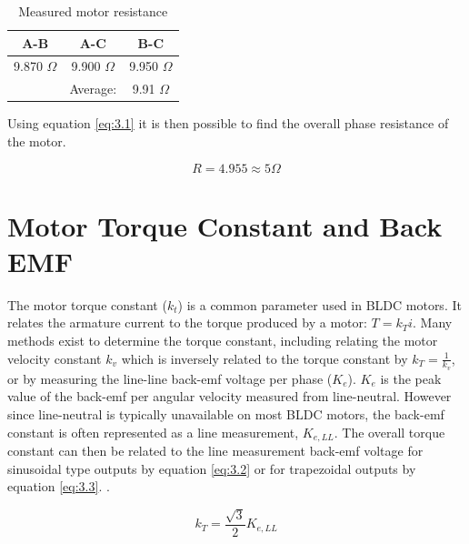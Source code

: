 \begin{table}[ht]
	\begin{center}
		\caption{Measured motor resistance}
		\begin{tabular}[c]{|c|c|c|}
			
			\hline
			\textbf{A-B} & \textbf{A-C} & \textbf{B-C}\\
			
			\hline
			9.870 \(\Omega\)  & 9.900  \(\Omega\) & 9.950 \(\Omega\) \\
			
			\hline
			& Average: & 9.91 \(\Omega\) \\
			
			\hline
			\end{tabular}
			
			\label{measured_motor_resistance}
	\end{center}
\end{table}

Using equation \ref{eq:3.1} it is then possible to find the overall phase resistance of the motor.

\begin{tcolorbox}[standard jigsaw,
	opacityback=0]
	\[R = 4.955 \approx 5 \Omega \]
	
\end{tcolorbox}

\section{Motor Torque Constant and Back EMF}
The motor torque constant (\(k_t\)) is a common parameter used in BLDC motors. It relates the armature current to the torque produced by a motor: \(T = k_T i \). Many methods exist to determine the torque constant, including relating the motor velocity constant \(k_v\) which is inversely related to the torque constant by \(k_T = \frac{1}{k_v} \), or by measuring the line-line back-emf voltage per phase (\(K_e\)). \(K_e\) is the peak value of the back-emf per angular velocity measured from line-neutral. However since line-neutral is typically unavailable on most BLDC motors, the back-emf constant is often represented as a line measurement, \(K_{e,LL}\). The overall torque constant can then be related to the line measurement back-emf voltage for sinusoidal type outputs by equation \ref{eq:3.2} or for trapezoidal outputs by equation \ref{eq:3.3}. \citep{5}. 

\begin{equation} \label{eq:3.2}
k_T = \frac{\sqrt{3}}{2} K_{e,LL}
\end{equation}

